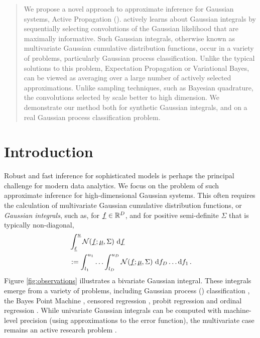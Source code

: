 \documentclass[twoside]{article}
\begin{document}

\begin{abstract}%
We propose a novel approach to approximate inference for Gaussian systems, Active Propagation (\ap). \ap actively learns about Gaussian integrals by sequentially selecting convolutions of the Gaussian likelihood that are maximally informative. Such Gaussian integrals, otherwise known as multivariate Gaussian cumulative distribution functions, occur in a variety of problems, particularly Gaussian process classification. Unlike the typical solutions to this problem, Expectation Propagation or Variational Bayes, \ap can be viewed as averaging over a large number of actively selected approximations. Unlike sampling techniques, such as Bayesian quadrature, the convolutions selected by \ap scale better to high dimension. We demonstrate our method both for synthetic Gaussian integrals, and on a real Gaussian process classification problem. 
\end{abstract}


\section{Introduction}

Robust and fast inference for sophisticated models is perhaps the principal challenge for modern data analytics. We focus on the problem of such approximate inference for high-dimensional Gaussian systems. This often requires the calculation of multivariate Gaussian cumulative distribution functions, or \emph{Gaussian integrals}, such as, for $\underline{\smash{f}}\in\mathbb{R}^D$, and for positive semi-definite $\Sigma$ that is typically non-diagonal,
\begin{align}\label{eq:GI}
& \int_{\underline{\smash{\ell}}}^{\underline{\smash{u}}} \mathcal{N}(\underline{\smash{f}};\underline{\smash{\mu}},\Sigma)~\mathrm{d} \underline{\smash{f}}\nonumber\\
& := \int_{l_1}^{u_1}\ldots\int_{l_D}^{u_D} \mathcal{N}(\underline{\smash{f}};\underline{\smash{\mu}},\Sigma)~\mathrm{d} f_D \ldots \mathrm{d} f_1\,.
\end{align}
Figure \ref{fig:observations} illustrates a bivariate Gaussian integral. These integrals emerge from a variety of problems, including Gaussian process (\gp) classification \citep{GpsBook}, the Bayes Point Machine \citep{herbrich2001bayes}, censored regression \citep{ertin2007gaussian}, probit regression \citep{ochi1984likelihood} and ordinal regression \citep{chu2005gaussian}. While univariate Gaussian integrals can be computed with machine-level precision (using approximations to the error function), the multivariate case remains an active research problem \citep{cunningham2011approximate}. 
\end{document}
